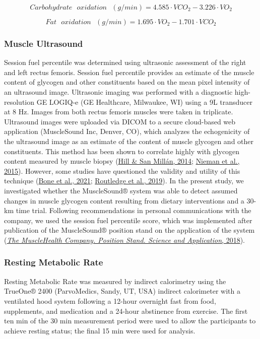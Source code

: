 \documentclass[]{cik}%
\begin{document}
\[
Carbohydrate \text{  } oxidation \text{  } (g/min) = 4.585 \cdot VCO_2 - 3.226 \cdot VO_2 
\]

\[
Fat \text{  } oxidation \text{  } (g/min) = 1.695 \cdot VO_2 - 1.701 \cdot VCO_2
\]

\hypertarget{muscle-ultrasound}{%
\subsubsection{Muscle Ultrasound}\label{muscle-ultrasound}}

Session fuel percentile was determined using ultrasonic assessment of
the right and left rectus femoris. Session fuel percentile provides an
estimate of the muscle content of glycogen and other constituents based
on the mean pixel intensity of an ultrasound image. Ultrasonic imaging
was performed with a diagnostic high-resolution GE LOGIQ-e (GE
Healthcare, Milwaukee, WI) using a 9L transducer at 8 Hz. Images from
both rectus femoris muscles were taken in triplicate. Ultrasound images
were uploaded via DICOM to a secure cloud-based web application
(MuscleSound Inc, Denver, CO), which analyzes the echogenicity of the
ultrasound image as an estimate of the content of muscle glycogen and
other constituents. This method has been shown to correlate highly with
glycogen content measured by muscle biopsy
(\protect\hyperlink{ref-29}{Hill \& San Millán, 2014};
\protect\hyperlink{ref-44}{Nieman et al., 2015}). However, some studies
have questioned the validity and utility of this technique
(\protect\hyperlink{ref-45}{Bone et al., 2021};
\protect\hyperlink{ref-46}{Routledge et al., 2019}). In the present
study, we investigated whether the MuscleSound® system was able to
detect assumed changes in muscle glycogen content resulting from dietary
interventions and a 30-km time trial. Following recommendations in
personal communications with the company, we used the session fuel
percentile score, which was implemented after publication of the
MuscleSound® position stand on the application of the system
(\protect\hyperlink{ref-47}{\emph{The MuscleHealth Company. Position
Stand. Science and Application}, 2018}).

\hypertarget{resting-metabolic-rate}{%
\subsubsection{Resting Metabolic Rate}\label{resting-metabolic-rate}}

Resting Metabolic Rate was measured by indirect calorimetry using the
TrueOne® 2400 (ParvoMedics, Sandy, UT, USA) indirect calorimeter with a
ventilated hood system following a 12-hour overnight fast from food,
supplements, and medication and a 24-hour abstinence from exercise. The
first ten min of the 30 min measurement period were used to allow the
participants to achieve resting status; the final 15 min were used for
analysis.
\end{document}
